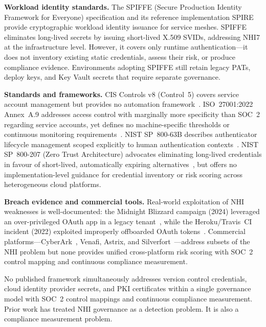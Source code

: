 \documentclass[journal]{IEEEtran}
\begin{document}
\textbf{Workload identity standards.} The SPIFFE (Secure Production Identity Framework for Everyone) specification and its reference implementation SPIRE~\cite{spiffe2024} provide cryptographic workload identity issuance for service meshes. SPIFFE eliminates long-lived secrets by issuing short-lived X.509 SVIDs, addressing NHI7 at the infrastructure level. However, it covers only runtime authentication---it does not inventory existing static credentials, assess their risk, or produce compliance evidence. Environments adopting SPIFFE still retain legacy PATs, deploy keys, and Key Vault secrets that require separate governance.

\textbf{Standards and frameworks.} CIS Controls v8 (Control~5) covers service account management but provides no automation framework~\cite{ciscontrols}. ISO~27001:2022 Annex~A.9 addresses access control with marginally more specificity than SOC~2 regarding service accounts, yet defines no machine-specific thresholds or continuous monitoring requirements~\cite{iso27001}. NIST SP~800-63B describes authenticator lifecycle management scoped explicitly to human authentication contexts~\cite{nist80063b}. NIST SP~800-207 (Zero Trust Architecture) advocates eliminating long-lived credentials in favour of short-lived, automatically expiring alternatives~\cite{nist800207}, but offers no implementation-level guidance for credential inventory or risk scoring across heterogeneous cloud platforms.

\textbf{Breach evidence and commercial tools.} Real-world exploitation of NHI weaknesses is well-documented: the Midnight Blizzard campaign (2024) leveraged an over-privileged OAuth app in a legacy tenant~\cite{midnight2024}, while the Heroku/Travis~CI incident (2022) exploited improperly offboarded OAuth tokens~\cite{heroku2022}. Commercial platforms---CyberArk~\cite{cyberark2024}, Venafi, Astrix, and Silverfort~\cite{silverfort2025}---address subsets of the NHI problem but none provides unified cross-platform risk scoring with SOC~2 control mapping and continuous compliance measurement.

No published framework simultaneously addresses version control credentials, cloud identity provider secrets, and PKI certificates within a single governance model with SOC~2 control mappings and continuous compliance measurement. Prior work has treated NHI governance as a detection problem. It is also a compliance measurement problem.

\end{document}
